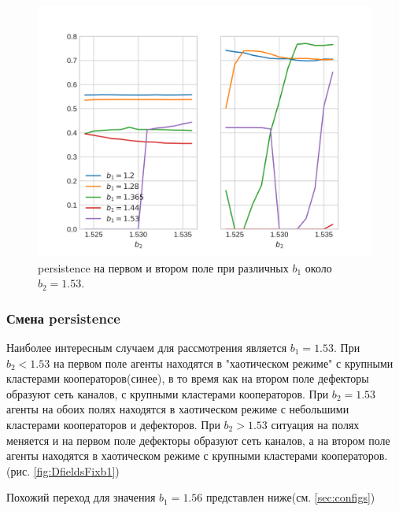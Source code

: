 \documentclass[12pt]{article}
\begin{document}
        \begin{figure}[H]
            \centering
            \includegraphics[width=0.95\columnwidth, keepaspectratio=True]{DoubleField/persistence_at_b_2_153.png}
            \caption{persistence на первом и втором поле при различных $b_1$ около $b_2=1.53$.}
            \label{fig:smallpers}
        \end{figure}

        \subsubsection{Смена persistence}
        \label{sec:persistence}
        Наиболее интересным случаем для рассмотрения является $b_1=1.53$. При $b_2 < 1.53$ на первом поле агенты находятся в "хаотическом режиме" с крупными кластерами кооператоров(синее), в то время как на втором поле дефекторы образуют сеть каналов, с крупными кластерами кооператоров. При $b_2=1.53$ агенты на обоих полях находятся в хаотическом режиме с небольшими кластерами кооператоров и дефекторов.
        При $b_2 > 1.53$ ситуация на полях меняется и на первом поле дефекторы образуют сеть каналов, а на втором поле агенты находятся в хаотическом режиме с крупными кластерами кооператоров.(рис. \ref{fig:DfieldsFixb1})
        
        Похожий переход для значения $b_1=1.56$ представлен ниже(см. \ref{sec:configs})
        
\end{document}
